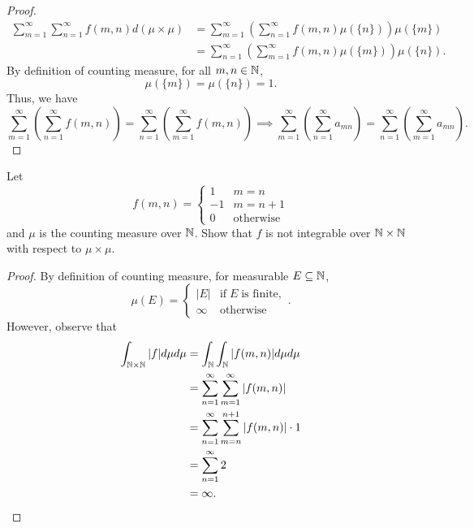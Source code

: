 \documentclass[class=book, crop=false]{standalone}
\begin{document}
\begin{proof}
\begin{align*}
                \sum^{\infty}_{m = 1} \sum^{\infty}_{n = 1} f(m, n) d(\mu \times \mu) &= \sum^{\infty}_{m = 1} \left(\sum^{\infty}_{n = 1} f(m, n) \mu(\{n\}) \right) \mu(\{m\}) \\
                &= \sum^{\infty}_{n = 1} \left(\sum^{\infty}_{m = 1} f(m, n) \mu(\{m\}) \right) \mu(\{n\}).
            \end{align*}
            By definition of counting measure, for all $m, n \in \mathbb{N}$,
            \begin{equation*}
                \mu(\{m\}) = \mu(\{n\}) = 1.
            \end{equation*}
            Thus, we have
            \begin{equation*}
                \sum^{\infty}_{m = 1} \left(\sum^{\infty}_{n = 1} f(m, n)\right) = \sum^{\infty}_{n = 1} \left(\sum^{\infty}_{m = 1} f(m, n)\right) \implies \sum^{\infty}_{m = 1} \left(\sum^{\infty}_{n = 1} a_{mn}\right) = \sum^{\infty}_{n = 1} \left(\sum^{\infty}_{m = 1} a_{mn}\right).
            \end{equation*}
        \end{proof}

        \begin{question}
            Let
            \begin{equation*}
                f(m, n) = \begin{cases}
                    1 & m = n \\
                    -1 & m = n + 1 \\
                    0 & \text{otherwise}
                \end{cases}
            \end{equation*}
            and $\mu$ is the counting measure over $\mathbb{N}$. Show that $f$ is not integrable over $\mathbb{N} \times \mathbb{N}$ with respect to $\mu \times \mu$.
        \end{question}
        \begin{proof}
            By definition of counting measure, for measurable $E \subseteq \mathbb{N}$,
            \begin{equation*}
                \mu(E) = \begin{cases}
                    |E| & \text{if}\;E\;\text{is finite}, \\
                    \infty & \text{otherwise}
                \end{cases}.
            \end{equation*}
            However, observe that
            \begin{align*}
                \int_{\mathbb{N} \times \mathbb{N}} |f| d\mu d\mu &= \int_{\mathbb{N}} \int_{\mathbb{N}} |f(m, n)| d\mu d\mu \\
                &= \sum^{\infty}_{n = 1} \sum^{\infty}_{m = 1} |f(m, n)| \\
                &= \sum^{\infty}_{n = 1} \sum^{n + 1}_{m = n} |f(m, n)| \cdot 1 \\
                &= \sum^{\infty}_{n = 1} 2 \\
                &= \infty.
            \end{align*}
        \end{proof}
\end{document}
